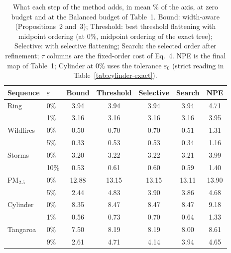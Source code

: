\begin{table}[!htb]
\centering
\caption{What each step of the method adds, in mean \% of the axis, at zero budget and at the Balanced budget of Table~1. Bound: width-aware (Propositions~2 and~3); Threshold: best threshold flattening with midpoint ordering (at 0\%, midpoint ordering of the exact tree); Selective: with selective flattening; Search: the selected order after refinement; $\tau$ columns are the fixed-order cost of Eq.~4. NPE is the final map of Table~1; Cylinder at 0\% uses the tolerance $\varepsilon_0$ (strict reading in Table~\ref{tab:cylinder-exact}).}
\label{tab:ablation}
\footnotesize
\setlength{\tabcolsep}{3pt}
\begin{tabular}{@{}llccccc@{}}
\toprule
Sequence & $\varepsilon$ & Bound & Threshold & Selective & Search & NPE \\
\midrule
Ring & 0\% & 3.94 & 3.94 & 3.94 & 3.94 & 4.71 \\
 & 1\% & 3.16 & 3.16 & 3.16 & 3.16 & 3.95 \\
Wildfires & 0\% & 0.50 & 0.70 & 0.70 & 0.51 & 1.31 \\
 & 5\% & 0.33 & 0.53 & 0.53 & 0.34 & 1.16 \\
Storms & 0\% & 3.20 & 3.22 & 3.22 & 3.21 & 3.99 \\
 & 10\% & 0.53 & 0.61 & 0.60 & 0.59 & 1.40 \\
PM$_{2.5}$ & 0\% & 12.88 & 13.15 & 13.15 & 13.11 & 13.90 \\
 & 5\% & 2.44 & 4.83 & 3.90 & 3.86 & 4.68 \\
Cylinder & 0\% & 8.35 & 8.47 & 8.47 & 8.47 & 9.18 \\
 & 1\% & 0.56 & 0.73 & 0.70 & 0.64 & 1.33 \\
Tangaroa & 0\% & 7.50 & 8.19 & 8.19 & 8.00 & 8.61 \\
 & 9\% & 2.61 & 4.71 & 4.14 & 3.94 & 4.65 \\
\bottomrule
\end{tabular}
\end{table}
